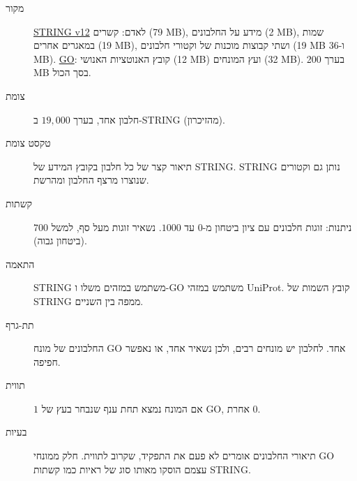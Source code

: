 \documentclass[11pt]{article}
\newcommand{\en}[1]{\foreignlanguage{english}{#1}}
\begin{document}
\begin{description}
\item[מקור] \href{https://version-12-0.string-db.org/cgi/download?species_text=Homo+sapiens}{\en{STRING v12}}
לאדם: קשרים (\en{79 MB}), מידע על החלבונים (\en{2 MB}), שמות במאגרים אחרים (\en{19 MB}), ושתי
קבוצות מוכנות של וקטורי חלבונים (\en{19 MB} ו-\en{36 MB}).
\href{https://geneontology.org/docs/download-go-annotations/downloads/}{\en{GO}}: קובץ האנוטציות
האנושי (\en{12 MB}) ועץ המונחים (\en{32 MB}). בערך \en{200 MB} בסך הכול.
\item[צומת] חלבון אחד, בערך $19{,}000$ ב-\en{STRING} (מהזיכרון).
\item[טקסט צומת] תיאור קצר של כל חלבון בקובץ המידע של \en{STRING}. \en{STRING} נותן גם וקטורים
שנוצרו מרצף החלבון ומהרשת.
\item[קשתות] ניתנות: זוגות חלבונים עם ציון ביטחון מ-$0$ עד $1000$. נשאיר זוגות מעל סף, למשל
$700$ (ביטחון גבוה).
\item[התאמה] \en{STRING} משתמש במזהים משלו ו-\en{GO} משתמש במזהי \en{UniProt}. קובץ השמות של
\en{STRING} ממפה בין השניים.
\item[תת-גרף] החלבונים של מונח \en{GO} אחד. לחלבון יש מונחים רבים, ולכן נשאיר אחד, או נאפשר חפיפה.
\item[תווית] $1$ אם המונח נמצא תחת ענף שנבחר בעץ של \en{GO}, אחרת $0$.
\item[בעיות] תיאורי החלבונים אומרים לא פעם את התפקיד, שקרוב לתווית. חלק ממונחי \en{GO} עצמם
הוסקו מאותו סוג של ראיות כמו קשתות \en{STRING}.
\end{description}
\end{document}
